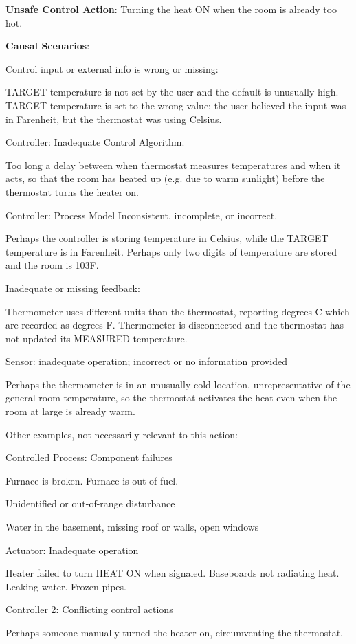 
\textbf{Unsafe Control Action}: Turning the heat ON when the room is already too hot.

\textbf{Causal Scenarios}:

\begin{compactitem}
\item Control input or external info is wrong or missing:
  
  TARGET temperature is not set by the user and the default is unusually high.
  TARGET temperature is set to the wrong value; the user believed the input was in Farenheit, but the thermostat was using Celsius.  

\item Controller: Inadequate Control Algorithm.
  
Too long a delay between when thermostat measures temperatures and when it acts, so that the room has heated up (e.g. due to warm sunlight) before the thermostat turns the heater on.  
\item Controller: Process Model Inconsistent, incomplete, or incorrect.

  Perhaps the controller is storing temperature in Celsius, while the TARGET temperature is in Farenheit.
  Perhaps only two digits of temperature are stored and the room is 103F.
\item Inadequate or missing feedback:

  Thermometer uses different units than the thermostat, reporting degrees C which are recorded as degrees F.
  Thermometer is disconnected and the thermostat has not updated its MEASURED temperature.
%
 \item Sensor: inadequate operation; incorrect or no information provided

   Perhaps the thermometer is in an unusually cold location, unrepresentative of the general room temperature, so the thermostat activates the heat even when the room at large is already warm.
\end{compactitem}

Other examples, not necessarily relevant to this action:

\begin{compactitem}
\item Controlled Process: Component failures
   
Furnace is broken. Furnace is out of fuel.
   \item Unidentified or out-of-range disturbance
   
Water in the basement, missing roof or walls, open windows
\item Actuator: Inadequate operation

  Heater failed to turn HEAT ON when signaled. Baseboards not radiating heat. Leaking water. Frozen pipes.

\item Controller 2: Conflicting control actions

Perhaps someone manually turned the heater on, circumventing the thermostat.
\end{compactitem}
